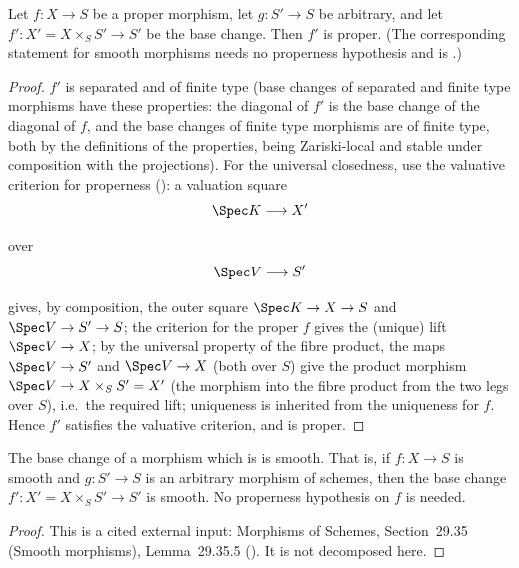 \begin{lemma}
\label{lem:pc-proper-base-change}
Let $f:X\to S$ be a proper morphism, let $g:S'\to S$ be arbitrary, and
let $f':X'=X\times_SS'\to S'$ be the base change.  Then $f'$ is
proper.  (The corresponding statement for smooth morphisms needs no
properness hypothesis and is .)
\end{lemma}
\begin{proof}
$f'$ is separated and of finite type (base changes
of separated and finite type morphisms have these properties: the
diagonal of $f'$ is the base change of the diagonal of $f$, and the
base changes of finite type morphisms are of finite type, both by the
definitions of the properties, being Zariski-local and stable under
composition with the projections).  For the universal closedness, use
the valuative criterion for properness
(): a valuation square
\[
\Spec K \longrightarrow X'
\]

\noindent over
\[
\Spec V \longrightarrow S'
\]

gives, by composition, the outer square
$\Spec K\to X\to S$ and $\Spec V\to S' \to S$; the criterion for the
proper $f$ gives the (unique) lift $\Spec V\to X$; by the universal
property of the fibre product, the maps $\Spec V\to S'$ and
$\Spec V\to X$ (both over $S$) give the product morphism
$\Spec V\to X\times_SS'=X'$
(the morphism into the fibre product from the two legs over $S$),
i.e.\ the required lift; uniqueness is inherited from the uniqueness
for $f$.  Hence $f'$ satisfies the valuative criterion, and is proper.
\end{proof}

\begin{lemma}
\label{lem:pc-smooth-base-change}
The base change of a morphism which is  is
smooth.  That is, if $f:X\to S$ is smooth and $g:S'\to S$ is an arbitrary morphism of
schemes, then the base change $f':X'=X\times_SS'\to S'$ is smooth.  No properness
hypothesis on $f$ is needed.
\end{lemma}
\begin{proof}
This is a cited external input: Morphisms of Schemes, Section~29.35 (Smooth morphisms),
Lemma~29.35.5 ().  It is not decomposed here.
\end{proof}

